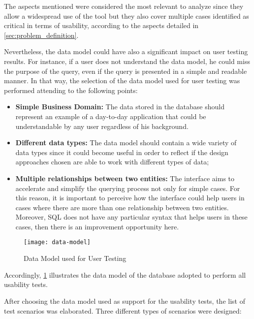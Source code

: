 The aspects mentioned were considered the most relevant to analyze since they allow a widespread use of the tool but they also cover multiple cases identified as critical in terms of usability, according to the aspects detailed in \ref{sec:problem_definition}.

Nevertheless, the data model could have also a significant impact on user testing results. For instance, if a user does not understand the data model, he could miss the purpose of the query, even if the query is presented in a simple and readable manner. In that way, the selection of the data model used for user testing was performed attending to the following points:

\begin{itemize}
    \item \textbf{Simple Business Domain: }The data stored in the database should represent an example of a day-to-day application that could be understandable by any user regardless of his background.
    \item \textbf{Different data types: }The data model should contain a wide variety of data types since it could become useful in order to reflect if the design approaches chosen are able to work with different types of data;
    \item \textbf{Multiple relationships between two entities: }The interface aims to accelerate and simplify the querying process not only for simple cases. For this reason, it is important to perceive how the interface could help users in cases where there are more than one relationship between two entities. Moreover, \gls{SQL} does not have any particular syntax that helps users in these cases, then there is an improvement opportunity here.
\end{itemize}

\begin{figure}[htbp]
	\centering
	\texttt{[image: data-model]}
	\caption{Data Model used for User Testing}
	\label{fig:dataModel}
\end{figure}

Accordingly, \ref{fig:dataModel} illustrates the data model of the database adopted to perform all usability tests.

After choosing the data model used as support for the usability tests, the list of test scenarios was elaborated. Three different types of scenarios were designed:

